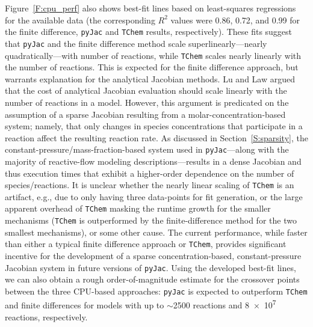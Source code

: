 \documentclass[preprint,12pt]{elsarticle}
\begin{document}
{Figure~\ref{F:cpu_perf} also shows best-fit lines based on least-squares regressions for the available data (the corresponding $R^2$ values were 0.86, 0.72, and 0.99 for the finite difference, \texttt{pyJac} and \texttt{TChem} results, respectively).
These fits suggest that \texttt{pyJac} and the finite difference method scale superlinearly---nearly quadratically---with number of reactions, while \texttt{TChem} scales nearly linearly with the number of reactions.
This is expected for the finite difference approach, but warrants explanation for the analytical Jacobian methods.
Lu and Law argued~\cite{Lu:2009gh} that the cost of analytical Jacobian evaluation should scale linearly with the number of reactions in a model.
However, this argument is predicated on the assumption of a sparse Jacobian resulting from a molar-concentration-based system; namely, that only changes in species concentrations that participate in a reaction affect the resulting reaction rate.
As discussed in Section~\ref{S:sparsity}, the constant-pressure\slash mass-fraction-based system used in \texttt{pyJac}---along with the majority of reactive-flow modeling descriptions---results in a dense Jacobian and thus execution times that exhibit a higher-order dependence on the number of species\slash reactions.
It is unclear whether the nearly linear scaling of \texttt{TChem} is an artifact, e.g., due to only having three data-points for fit generation, or the large apparent overhead of \texttt{TChem} masking the runtime growth for the smaller mechanisms (\texttt{TChem} is outperformed by the finite-difference method for the two smallest mechanisms), or some other cause.
The current performance, while faster than either a typical finite difference approach or \texttt{TChem}, provides significant incentive for the development of a sparse concentration-based, constant-pressure Jacobian system in future versions of \texttt{pyJac}.
Using the developed best-fit lines, we can also obtain a rough order-of-magnitude estimate for the crossover points between the three CPU-based approaches: \texttt{pyJac} is expected to outperform \texttt{TChem} and finite differences for models with up to $\sim$2500 reactions and \num{8e7} reactions, respectively.

}
\end{document}
